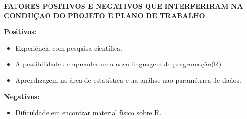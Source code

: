 \documentclass{article}
\begin{document}
\newpage
\begin{center}
\textbf{\large{FATORES POSITIVOS E NEGATIVOS QUE INTERFERIRAM NA CONDUÇÃO DO PROJETO E PLANO DE TRABALHO}}

\hrulefill 

\end{center}
\textbf{Positivos:}
\begin{itemize}
    \item Experiência com pesquisa científica.
    \item A possibilidade de aprender uma nova linguagem de programação(R).
    \item Aprendizagem na área de estatística e na análise não-paramétrica de dados.
\end{itemize}
\textbf{Negativos:}
\begin{itemize}
    \item Dificuldade em encontrar material físico sobre R.
\end{itemize}

\newpage


\end{document}
